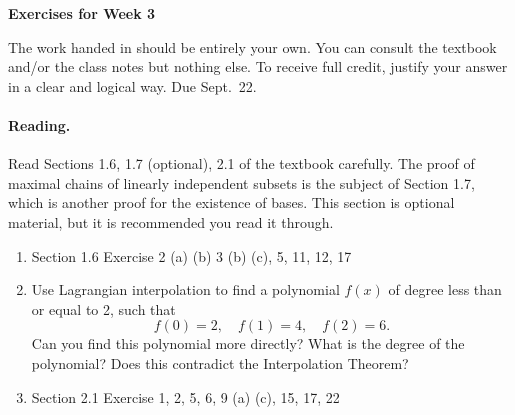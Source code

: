 \documentclass[11pt]{article}
\theoremstyle{plain}
\theoremstyle{definition}
\begin{document}
\begin{center}
{\Large \bf Exercises for Week 3}
\end{center}
The work handed in should be entirely your own. You can consult the textbook and/or the class notes but nothing else. To receive full credit, justify your answer in a clear and logical way. Due Sept.~22.

\paragraph{Reading.} Read Sections 1.6, 1.7 (optional), 2.1 of the textbook carefully. The proof of maximal chains of linearly independent subsets is the subject of Section 1.7, which is another proof for the existence of bases. This section is optional material, but it is recommended you read it through.

\begin{enumerate}
\item Section 1.6 Exercise 2 (a) (b) 3 (b) (c), 5, 11, 12, 17
\item Use Lagrangian interpolation to find a polynomial $f(x)$ of degree less than or equal to 2, such that
\[
f(0)=2, \quad f(1)=4, \quad f(2)=6.
\] 
Can you find this polynomial more directly? What is the degree of the polynomial? Does this contradict the Interpolation Theorem?
\item Section 2.1 Exercise 1, 2, 5, 6, 9 (a) (c), 15, 17, 22
\end{enumerate}
\end{document}
